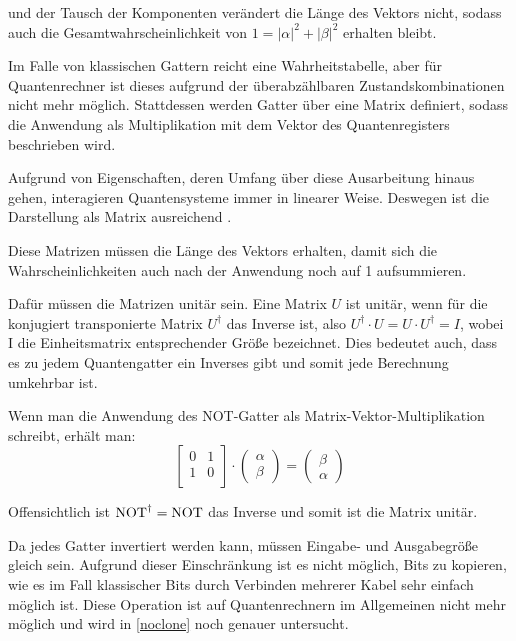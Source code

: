 \documentclass{acm_proc_article-sp}
\begin{document}
und der Tausch der Komponenten verändert die Länge des Vektors nicht, sodass auch die Gesamtwahrscheinlichkeit
von $1 = |\alpha|^2 + |\beta|^2$ erhalten bleibt.

Im Falle von klassischen Gattern reicht eine Wahr\-heits\-tabelle, aber für Quantenrechner ist
dieses aufgrund der überabzählbaren Zustandskombinationen nicht mehr möglich. Stattdessen werden Gatter über eine Matrix definiert,
sodass die Anwendung als Multiplikation mit dem Vektor des Quantenregisters beschrieben wird.

Aufgrund von Eigenschaften, deren Umfang über diese Ausarbeitung hinaus gehen, interagieren Quantensysteme immer 
in linearer Weise. Deswegen ist die Darstellung als Matrix ausreichend \cite{Barenco}.

Diese Matrizen müssen die Länge des Vektors erhalten, damit sich die Wahrscheinlichkeiten auch nach der Anwendung 
noch auf 1 aufsummieren.

Dafür müssen die Matrizen unitär sein. Eine Matrix $U$ ist unitär, wenn für die konjugiert transponierte Matrix $U^{\dagger}$ das
Inverse ist, also $U^\dagger \cdot U = U \cdot U^\dagger = I$, wobei I die Einheitsmatrix entsprechender Größe bezeichnet.
Dies bedeutet auch, dass es zu jedem Quantengatter ein Inverses gibt und somit jede Berechnung umkehrbar ist.

Wenn man die Anwendung des NOT-Gatter als Matrix-Vektor-Multiplikation schreibt, erhält man:
\[
\begin{bmatrix}
    0 & 1 \\
    1 & 0 \\
\end{bmatrix} \cdot 
\begin{pmatrix}
    \alpha \\ \beta
\end{pmatrix} = 
\begin{pmatrix}
    \beta \\ \alpha
\end{pmatrix} 
\]

Offensichtlich ist $\operatorname{NOT}^\dagger = \operatorname{NOT}$ das Inverse und somit ist die Matrix unitär.

Da jedes Gatter invertiert werden kann, müssen Eingabe- und Ausgabegröße gleich sein. 
Aufgrund dieser Einschränkung ist es nicht möglich, Bits zu kopieren, wie es im Fall klassischer Bits durch 
Verbinden mehrerer Kabel sehr einfach möglich ist. 
Diese Operation ist auf Quantenrechnern im Allgemeinen nicht mehr möglich und wird in 
\autoref{noclone} noch genauer untersucht.
\end{document}
